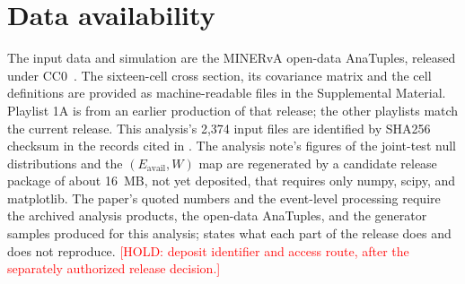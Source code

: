 \documentclass[aps,prd,reprint,superscriptaddress,nofootinbib,floatfix,longbibliography]{revtex4-2}
\newcommand{\Eavail}{E_{\mathrm{avail}}}
\newcommand{\pubhold}[1]{\textcolor{red}{[HOLD: #1]}}
\numberwithin{equation}{section}
\begin{document}
\section*{Data availability}
\label{sec:data-availability}
The input data and simulation are the MINERvA open-data AnaTuples, released under CC0~\cite{MINERvA:OpenData}.  The sixteen-cell cross section, its covariance matrix and the cell definitions are provided as machine-readable files in the Supplemental Material.  Playlist 1A is from an earlier production of that release; the other playlists match the current release. This analysis's 2,374 input files are identified by SHA256 checksum in the records cited in .  The analysis note's figures of the joint-test null distributions and the $(\Eavail,W)$ map are regenerated by a candidate release package of about \SI{16}{MB}, not yet deposited, that requires only numpy, scipy, and matplotlib.  The paper's quoted numbers and the event-level processing require the archived analysis products, the open-data AnaTuples, and the generator samples produced for this analysis;  states what each part of the release does and does not reproduce. \pubhold{deposit identifier and access route, after the separately authorized release decision.}


\end{document}
